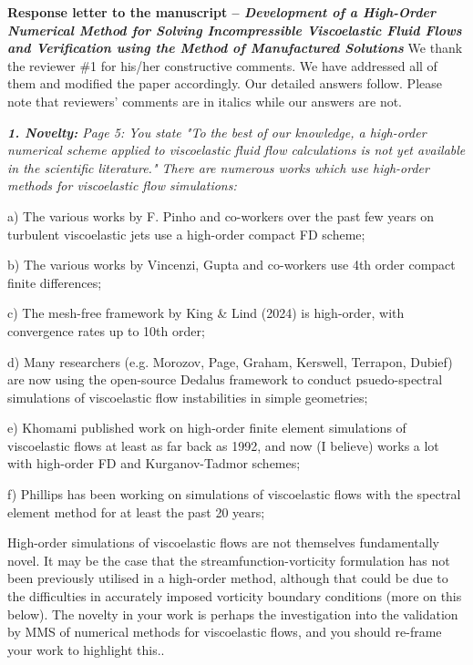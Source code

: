 \documentclass[12pt]{article}
\begin{document}
{\large \textbf{Response letter to the manuscript
-- \emph{Development of a High-Order Numerical Method for Solving Incompressible Viscoelastic Fluid Flows and Verification using the Method of Manufactured Solutions}}}
\vspace{0.8cm}
We thank the reviewer \#1 for his/her constructive comments. We have addressed all of them and modified the paper accordingly. Our detailed answers follow. Please note that reviewers' comments are in italics while our answers are not.
\vspace{0.8cm}

{\it \textbf{1. Novelty:}
Page 5: You state "To the best of our knowledge, a high-order numerical scheme applied to viscoelastic fluid flow calculations is not yet available in the scientific literature." There are numerous works which use high-order methods for viscoelastic flow simulations:

a) The various works by F. Pinho and co-workers over the past few years on turbulent viscoelastic jets use a high-order compact FD scheme;

b) The various works by Vincenzi, Gupta and co-workers use 4th order compact finite differences;

c) The mesh-free framework by King \& Lind (2024) is high-order, with convergence rates up to 10th order;

d) Many researchers (e.g. Morozov, Page, Graham, Kerswell, Terrapon, Dubief) are now using the open-source Dedalus framework to conduct psuedo-spectral simulations of viscoelastic flow instabilities in simple geometries;

e) Khomami published work on high-order finite element simulations of viscoelastic flows at least as far back as 1992, and now (I believe) works a lot with high-order FD and Kurganov-Tadmor schemes;

f) Phillips has been working on simulations of viscoelastic flows with the spectral element method for at least the past 20 years;

High-order simulations of viscoelastic flows are not themselves fundamentally novel. It may be the case that the streamfunction-vorticity formulation has not been previously utilised in a high-order method, although that could be due to the difficulties in accurately imposed vorticity boundary conditions (more on this below). The novelty in your work is perhaps the investigation into the validation by MMS of numerical methods for viscoelastic flows, and you should re-frame your work to highlight this..}
\vspace{3mm}
\end{document}
